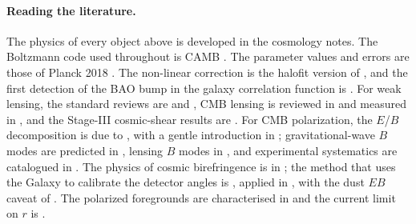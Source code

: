\paragraph{Reading the literature.}
The physics of every object above is developed in the cosmology notes. The Boltzmann code used throughout is CAMB \cite{CAMB2000}. The parameter values and errors are those of Planck 2018 \cite{Planck2018VI}. The non-linear correction is the halofit version of \cite{Takahashi2012}, and the first detection of the BAO bump in the galaxy correlation function is \cite{Eisenstein2005}. For weak lensing, the standard reviews are \cite{BartelmannSchneider2001} and \cite{Kilbinger2015}, CMB lensing is reviewed in \cite{LewisChallinor2006} and measured in \cite{Planck2018VIII}, and the Stage-III cosmic-shear results are \cite{Asgari2021KiDS,Amon2022DES,Hikage2019HSC}. For CMB polarization, the $E$/$B$ decomposition is due to \cite{ZaldarriagaSeljak1997,Kamionkowski1997}, with a gentle introduction in \cite{HuWhite1997Pol}; gravitational-wave $B$ modes are predicted in \cite{SeljakZaldarriaga1997}, lensing $B$ modes in \cite{ZaldarriagaSeljak1998}, and experimental systematics are catalogued in \cite{HuHedmanZaldarriaga2003}. The physics of cosmic birefringence is in \cite{CarrollFieldJackiw1990,Carroll1998,LueWangKamionkowski1999}; the method that uses the Galaxy to calibrate the detector angles is \cite{Minami2019}, applied in \cite{MinamiKomatsu2020,DiegoPalazuelos2022,EskiltKomatsu2022}, with the dust $EB$ caveat of \cite{Clark2021}. The polarized foregrounds are characterised in \cite{Planck2018XI} and the current limit on $r$ is \cite{BICEPKeck2021}.
  